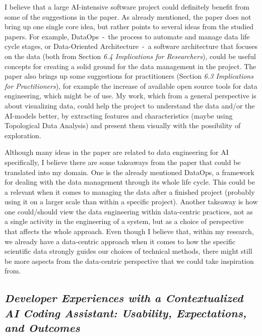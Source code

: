 \documentclass[11pt]{article}
\begin{document}
I believe that a large AI-intensive software project could definitely benefit from some of the suggestions in the paper. As already mentioned, the paper does not bring up one single core idea, but rather points to several ideas from the studied papers. For example, DataOps~-~the process to automate and manage data life cycle stages, or Data-Oriented Architecture~-~a software architecture that focuses on the data (both from Section \textit{6.4 Implications for Researchers}), could be useful concepts for creating a solid ground for the data management in the project. The paper also brings up some suggestions for practitioners (Section \textit{6.3 Implications for Practitioners}), for example the increase of available open source tools for data engineering, which might be of use.
My work, which from a general perspective is about visualizing data, could help the project to understand the data and/or the AI-models better, by extracting features and characteristics (maybe using Topological Data Analysis) and present them visually with the possibility of exploration. 

Although many ideas in the paper are related to data engineering for AI specifically, I believe there are some takeaways from the paper that could be translated into my domain.
One is the already mentioned DataOps, a framework for dealing with the data management through its whole life cycle. This could be a relevant when it comes to managing the data after a finished project (probably using it on a larger scale than within a specific project). 
Another takeaway is how one could/should view the data engineering within data-centric practices, not as a single activity in the engineering of a system, but as a choice of perspective that affects the whole approach. 
Even though I believe that, within my research, we already have a data-centric approach when it comes to how the specific scientific data strongly guides our choices of technical methods, there might still be more aspects from the data-centric perspective that we could take inspiration from.

\subsection{\textit{Developer Experiences with a Contextualized AI Coding Assistant: Usability, Expectations, and Outcomes}}
\end{document}
